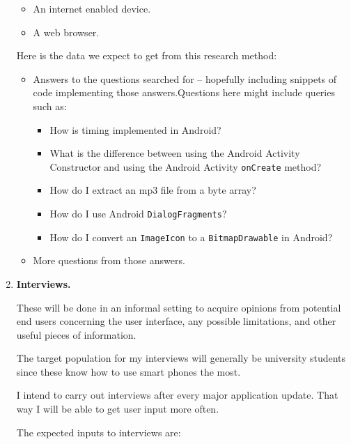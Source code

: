 \documentclass[12pt,svgnames,smaller]{article} %
\begin{document}
\begin{enumerate}
		\begin{itemize}
			\item An internet enabled device.
			\item A web browser. 
		\end{itemize}
		
		Here is the data we expect to get from this research method:
		
		\begin{itemize}
			\item Answers to the questions searched for – hopefully including snippets of code implementing those answers.Questions here might include queries such as:
			
			\begin{itemize}
				\item How is timing implemented in Android?
				\item What is the difference between using the Android Activity Constructor and using the Android Activity \texttt{onCreate} method?
				\item How do I extract an mp3 file from a byte array?
				\item How do I use Android \texttt{DialogFragments}?
				\item How do I convert an \texttt{ImageIcon} to a \texttt{BitmapDrawable} in Android?
			\end{itemize} 
			
			\item More questions from those answers.
		\end{itemize}

		
		\item \textbf{Interviews.}
		
		These will be done in an informal setting to acquire opinions from potential end users concerning the user interface, any possible limitations, and other useful pieces of information.
				
		The target population for my interviews will generally be university students since these know how to use smart phones the most.
		
		I intend to carry out interviews after every major application update. That way I will be able to get user input more often.
				
		The expected inputs to interviews are: 
				

\end{enumerate}
\end{document}
